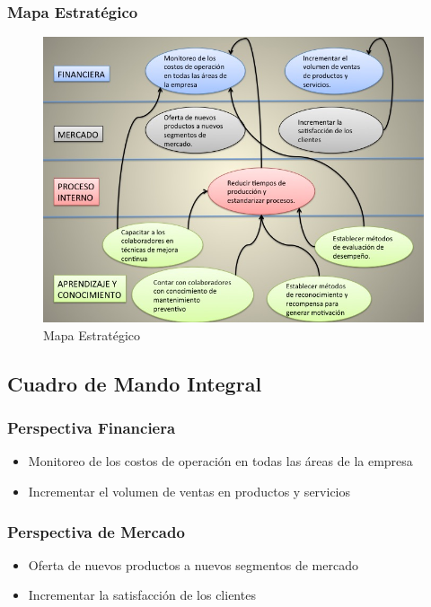 \documentclass[12pt, a4paper]{article}
\begin{document}
\subsubsection{Mapa Estratégico}

\begin{figure}[H]
  \centering
  
    \includegraphics[width=1.1\textwidth]{Diapositiva1.jpg}
  \captionsetup{justification=centering} %
  \caption{Mapa Estratégico}
  \label{figura:1}
\end{figure}

\subsection{Cuadro de Mando Integral}
\subsubsection{Perspectiva Financiera}
	\begin{itemize}	
	\item Monitoreo de los costos de operación en todas las áreas de la empresa

	\item  Incrementar el volumen de ventas en productos y servicios

\end{itemize}

\subsubsection{Perspectiva de Mercado}
	\begin{itemize}	
		\item Oferta de nuevos productos a nuevos segmentos de mercado

		\item Incrementar la satisfacción de los clientes
	\end{itemize}
	
\end{document}
